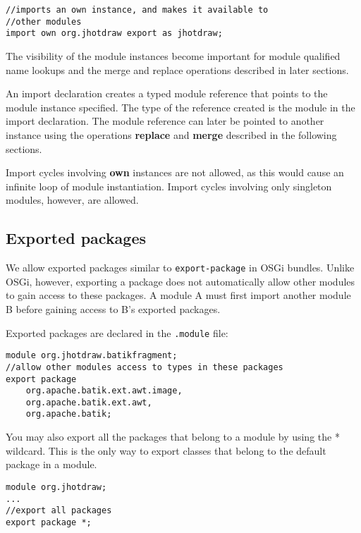 \begin{lstlisting}
//imports an own instance, and makes it available to
//other modules
import own org.jhotdraw export as jhotdraw;
\end{lstlisting}

The visibility of the module instances become important for module
qualified name lookups and the merge and replace operations described in later
sections.

An import declaration creates a typed module reference that points to the module
instance specified. The type of the reference created is the module
in the import declaration. The module reference can later be pointed to another
instance using the operations \textbf{replace} and \textbf{merge} described
in the following sections.

Import cycles involving \textbf{own} instances are not allowed, as this would 
cause an infinite loop of module instantiation. Import cycles involving only
singleton modules, however, are allowed.

\subsection{Exported packages}

We allow exported packages similar to {\tt export-package} in OSGi bundles. Unlike OSGi, however,
exporting a package does not automatically allow other modules to gain
access to these packages. A module A must first import another module B
before gaining access to B's exported packages.

Exported packages are declared in the {\tt .module} file:

\begin{lstlisting}
module org.jhotdraw.batikfragment;
//allow other modules access to types in these packages
export package 
	org.apache.batik.ext.awt.image,
	org.apache.batik.ext.awt,
	org.apache.batik;
\end{lstlisting}

You may also export all the packages that belong to a module by using
the * wildcard. This is the only way to export classes that belong to
the default package in a module.

\begin{lstlisting}
module org.jhotdraw;
...
//export all packages
export package *;
\end{lstlisting}


